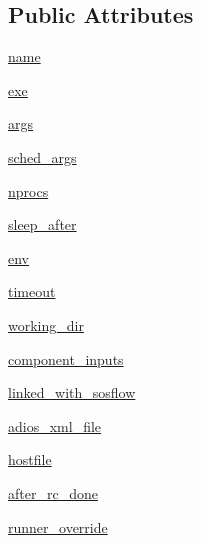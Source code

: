 \subsection*{Public Attributes}
\begin{DoxyCompactItemize}
\item 
\hyperlink{classcodar_1_1cheetah_1_1model_1_1_run_component_a743773d825aa10e6ef12ae695277c039}{name}
\item 
\hyperlink{classcodar_1_1cheetah_1_1model_1_1_run_component_ad2e4c00739c82e7a9e777056f6735a72}{exe}
\item 
\hyperlink{classcodar_1_1cheetah_1_1model_1_1_run_component_a61b71b40331e4375a82cf0be848acff5}{args}
\item 
\hyperlink{classcodar_1_1cheetah_1_1model_1_1_run_component_a4894bb7231945d68c104e3f9d647066b}{sched\+\_\+args}
\item 
\hyperlink{classcodar_1_1cheetah_1_1model_1_1_run_component_af9dfa80f9ec439a94ca09d7db279c63c}{nprocs}
\item 
\hyperlink{classcodar_1_1cheetah_1_1model_1_1_run_component_acb1eadc1f5def0e5b74cef8042ee3baa}{sleep\+\_\+after}
\item 
\hyperlink{classcodar_1_1cheetah_1_1model_1_1_run_component_ab041ae0903ff2773788ef1759b5aeca0}{env}
\item 
\hyperlink{classcodar_1_1cheetah_1_1model_1_1_run_component_aab7eb17918554027035c553b8580c140}{timeout}
\item 
\hyperlink{classcodar_1_1cheetah_1_1model_1_1_run_component_a63435d4ed53fefe7a99230d88cae4e32}{working\+\_\+dir}
\item 
\hyperlink{classcodar_1_1cheetah_1_1model_1_1_run_component_a1d8cb3d579339ac5eba3c0311640b382}{component\+\_\+inputs}
\item 
\hyperlink{classcodar_1_1cheetah_1_1model_1_1_run_component_a70c8417b14f64e93c812d52d63180e1f}{linked\+\_\+with\+\_\+sosflow}
\item 
\hyperlink{classcodar_1_1cheetah_1_1model_1_1_run_component_a2a855ca947ebabda952f8dab7c1fe4a6}{adios\+\_\+xml\+\_\+file}
\item 
\hyperlink{classcodar_1_1cheetah_1_1model_1_1_run_component_abcc514032d8dc3c203db3fea1e0cd94b}{hostfile}
\item 
\hyperlink{classcodar_1_1cheetah_1_1model_1_1_run_component_a0ea6b3921652cd3852a5e2425d9a80ca}{after\+\_\+rc\+\_\+done}
\item 
\hyperlink{classcodar_1_1cheetah_1_1model_1_1_run_component_ac5ca127f98817a9a14ef6d63d9b53d4f}{runner\+\_\+override}
\end{DoxyCompactItemize}


